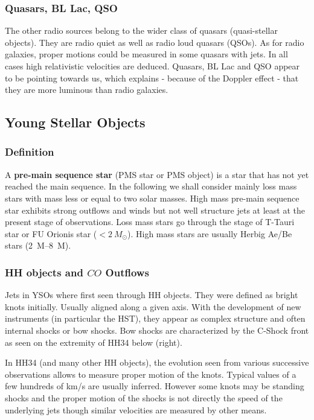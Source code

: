 \documentclass[10pt,a4paper,english,draft]{article}
\begin{document}
\subsubsection{Quasars, BL Lac, QSO}

The other radio sources belong to the wider class of quasars (quasi-stellar
objects). They are radio quiet as well as radio loud quasars (QSOs). As for
radio galaxies, proper motions could be measured in some quasars with jets. In
all cases high relativistic velocities are deduced. Quasars, BL Lac and QSO
appear to be pointing towards us, which explains - because of the Doppler
effect - that they are more luminous than radio galaxies.

\subsection{Young Stellar Objects}

\subsubsection{Definition}

A \textbf{pre-main sequence star} (PMS star or PMS object) is a star that has
not yet reached the main sequence. In the following we shall consider mainly
loss mass stars with mass less or equal to two solar masses. High mass pre-main
sequence star exhibits strong outflows and winds but not well structure jets at
least at the present stage of observations. Loss mass stars go through the
stage of T-Tauri star or FU Orionis star ($<\SI{2}{M_\odot}$). High mass stars are
usually Herbig Ae/Be stars (\SIrange{2}{8}{M_\odot}).

\subsubsection{\texorpdfstring{HH objects and $CO$ Outflows}{HH objects and CO Outflows}}

Jets in YSOs where first seen through HH objects. They were defined as bright
knots initially. Usually aligned along a given axis. With the development of
new instruments (in particular the HST), they appear as complex structure and
often internal shocks or bow shocks. Bow shocks are characterized by the
C-Shock front as seen on the extremity of HH34 below (right).

In HH34 (and many other HH objects), the evolution seen from various successive
observations allows to measure proper motion of the knots. Typical values of a
few hundreds of km/s are usually inferred. However some knots may be standing
shocks and the proper motion of the shocks is not directly the speed of the
underlying jets though similar velocities are measured by other means.
\end{document}

